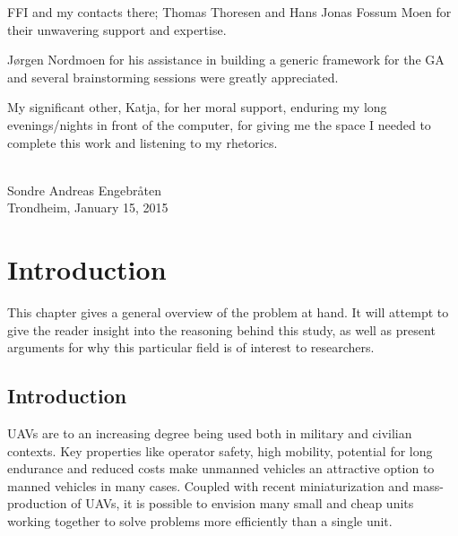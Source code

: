 \documentclass[10pt,a4paper]{book}
\begin{document}
\gls{FFI} and my contacts there; Thomas Thoresen and Hans Jonas Fossum Moen for their unwavering support and expertise.

Jørgen Nordmoen for his assistance in building a generic framework for the \gls{GA} and several brainstorming sessions were greatly appreciated. 

My significant other, Katja, for her moral support, enduring my long evenings/nights in front of the computer, for giving me the space I needed to complete this work and listening to my rhetorics.\\\\
\begin{flushright}
Sondre Andreas Engebråten\\
Trondheim, January 15, 2015 
\end{flushright}



\begingroup
\makeatletter
\def\@makeschapterhead#1{%
  {\parindent \z@ \raggedright
    \normalfont
    \interlinepenalty\@M
    \Huge \bfseries  #1\par\nobreak
    \vskip 40\p@
  }}
\makeatother


\tableofcontents

\listoffigures

\listoftables
\newpage

\endgroup


\chapter{Introduction}
\glsresetall

This chapter gives a general overview of the problem at hand. It will attempt to give the reader insight into the reasoning behind this study, as well as present arguments for why this particular field is of interest to researchers.
\newpage

\section{Introduction}
\glspl{UAV} are to an increasing degree being used both in military and civilian contexts. Key properties like operator safety, high mobility, potential for long endurance and reduced costs make unmanned vehicles an attractive option to manned vehicles in many cases. Coupled with recent miniaturization and mass-production of \glspl{UAV}, it is possible to envision many small and cheap units working together to solve problems more efficiently than a single unit.
\end{document}

